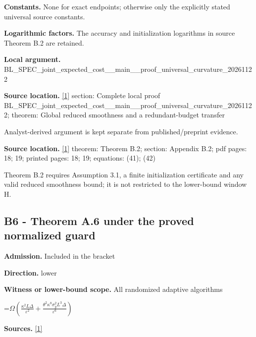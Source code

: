 \documentclass[10pt,a4paper]{article}
\newcommand{\AtlasMath}[1]{\par\begingroup\centering\setbox0=\hbox{$\displaystyle #1$}\ifdim\wd0>1.4\linewidth\typeout{ATLAS WIDE FORMULA: \the\wd0}\fi\ifdim\wd0>\linewidth\resizebox{\linewidth}{!}{\box0}\else\box0\fi\par\endgroup}
\begin{document}
\textbf{Constants.} None for exact endpoints; otherwise only the explicitly stated universal source constants.



\textbf{Logarithmic factors.} The accuracy and initialization logarithms in source Theorem B.2 are retained.



\textbf{Local argument.} BL\_SPEC\_joint\_expected\_c\allowbreak{}ost\_\_main\_\_proof\_univers\allowbreak{}al\_curvature\_20261122



\textbf{Source location.} \href{https://arxiv.org/pdf/2610.03633v2}{[1]} section: Complete local proof BL\_SPEC\_joint\_expected\_c\allowbreak{}ost\_\_main\_\_proof\_univers\allowbreak{}al\_curvature\_20261122; theorem: Global reduced smoothness and a redundant-budget transfer



Analyst-derived argument is kept separate from published/preprint evidence.



\textbf{Source location.} \href{https://arxiv.org/pdf/2610.03633v2}{[1]} theorem: Theorem B.2; section: Appendix B.2; pdf pages: 18; 19; printed pages: 18; 19; equations: (41); (42)



Theorem B.2 requires Assumption 3.1, a finite initialization certificate and any valid reduced smoothness bound; it is not restricted to the lower-bound window H.



\subsection{B6 - Theorem A.6 under the proved normalized guard}


\textbf{Admission.} Included in the bracket



\textbf{Direction.} lower



\textbf{Witness or lower-bound scope.} All randomized adaptive algorithms



\AtlasMath{\Omega\!\left(\frac{\kappa^2L\Delta}{\varepsilon^2}+\frac{\theta^2\kappa^8\sigma_g^2L^3\Delta}{\varepsilon^6}\right)}


\textbf{Sources.} \href{https://arxiv.org/pdf/2610.03633v2}{[1]}
\end{document}
